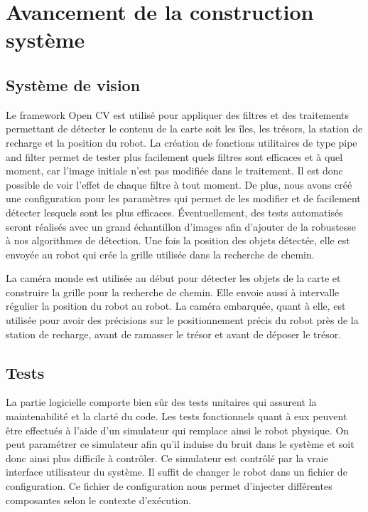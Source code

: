 \chapter{Avancement de la construction système}

\section{Système de vision}

Le framework Open CV est utilisé pour appliquer des filtres et des traitements permettant de détecter le contenu de la carte soit
les îles, les trésors, la station de recharge et la position du robot. La création de fonctions utilitaires de type pipe and filter
permet de tester plus facilement quels filtres sont efficaces et à quel moment, car l'image initiale n'est pas modifiée dans le
traitement. Il est donc possible de voir l'effet de chaque filtre à tout moment. De plus, nous avons créé une configuration
pour les paramètres qui permet de les modifier et de facilement détecter lesquels sont les plus efficaces. Éventuellement, des
tests automatisés seront réalisés avec un grand échantillon d'images afin d'ajouter de la robustesse à nos algorithmes de détection.
Une fois la position des objets détectée, elle est envoyée au robot qui crée la grille utilisée dans la recherche de chemin.


La caméra monde est utilisée au début pour détecter les objets de la carte et construire la grille pour la recherche de chemin. Elle envoie aussi à intervalle régulier la position du robot au robot. La caméra embarquée, quant à elle, est utilisée pour avoir des précisions sur le positionnement précis du robot près de la station de recharge, avant de ramasser le trésor et avant de déposer le trésor.

\section{Tests}
La partie logicielle comporte bien sûr des tests unitaires qui assurent la maintenabilité et la clarté du code.
Les tests fonctionnels quant à eux peuvent être effectués à l'aide d'un simulateur qui remplace ainsi le robot physique.
On peut paramétrer ce simulateur afin qu'il induise du bruit dans le système et soit donc ainsi plus difficile à contrôler.
Ce simulateur est contrôlé par la vraie interface utilisateur du système.
Il suffit de changer le robot dans un fichier de configuration.
Ce fichier de configuration nous permet d'injecter différentes composantes selon le contexte d'exécution.

